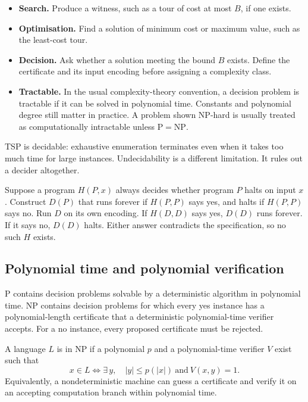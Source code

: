 \documentclass[12pt,a4paper]{article}
\begin{document}
\begin{itemize}[leftmargin=*, itemsep=3pt, topsep=4pt]
  \item \textbf{Search.} Produce a witness, such as a tour of cost at most $B$, if one exists.
  \item \textbf{Optimisation.} Find a solution of minimum cost or maximum value, such as the least-cost tour.
  \item \textbf{Decision.} Ask whether a solution meeting the bound $B$ exists. Define the certificate and its input encoding before assigning a complexity class.
  \item \textbf{Tractable.} In the usual complexity-theory convention, a decision problem is tractable if it can be solved in polynomial time. Constants and polynomial degree still matter in practice. A problem shown NP-hard is usually treated as computationally intractable unless $\mathrm{P}=\mathrm{NP}$.
\end{itemize}
TSP is decidable: exhaustive enumeration terminates even when it takes too much time for large instances. Undecidability is a different limitation. It rules out a decider altogether.
\begin{tcolorbox}[examplebox, title={Why the halting problem is undecidable}]
Suppose a program $H(P,x)$ always decides whether program $P$ halts on input $x$. Construct $D(P)$ that runs forever if $H(P,P)$ says yes, and halts if $H(P,P)$ says no. Run $D$ on its own encoding. If $H(D,D)$ says yes, $D(D)$ runs forever. If it says no, $D(D)$ halts. Either answer contradicts the specification, so no such $H$ exists.
\end{tcolorbox}

\subsection{Polynomial time and polynomial verification}
\begin{tcolorbox}[defbox, title={The classes P and NP}]
$\mathrm{P}$ contains decision problems solvable by a deterministic algorithm in polynomial time. $\mathrm{NP}$ contains decision problems for which every yes instance has a polynomial-length certificate that a deterministic polynomial-time verifier accepts. For a no instance, every proposed certificate must be rejected.
\end{tcolorbox}

\begin{tcolorbox}[formulabox, title={Formal verifier definition}]
A language $L$ is in $\mathrm{NP}$ if a polynomial $p$ and a polynomial-time verifier $V$ exist such that
\[
x\in L \iff \exists\, y,\quad |y|\le p(|x|)\ \text{and}\ V(x,y)=1.
\]
Equivalently, a nondeterministic machine can guess a certificate and verify it on an accepting computation branch within polynomial time.
\end{tcolorbox}
\end{document}
